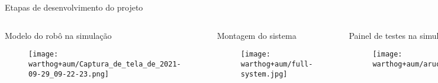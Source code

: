 \begin{frame}[t]{Etapas de desenvolvimento do projeto} 
   
    \begin{columns}[t]

        \begin{center}
            Modelo do robô na simulação
            \begin{figure}
            \texttt{[image: warthog+aum/Captura\_de\_tela\_de\_2021-09-29\_09-22-23.png]}
        \end{figure}
        \end{center}

        \begin{center}
            Montagem do sistema
            \begin{figure}
            \texttt{[image: warthog+aum/full-system.jpg]}
        \end{figure}
        \end{center}

        \begin{center}
            Painel de testes na simulação
            \begin{figure}
                \texttt{[image: warthog+aum/aruco.png]}
            \end{figure}
        \end{center}

        \begin{center}
            Montagem do painel de testes
            \begin{figure}
                \texttt{[image: warthog+aum/aruco.jpeg]}
            \end{figure}
        \end{center}

    \end{columns}

\end{frame}

